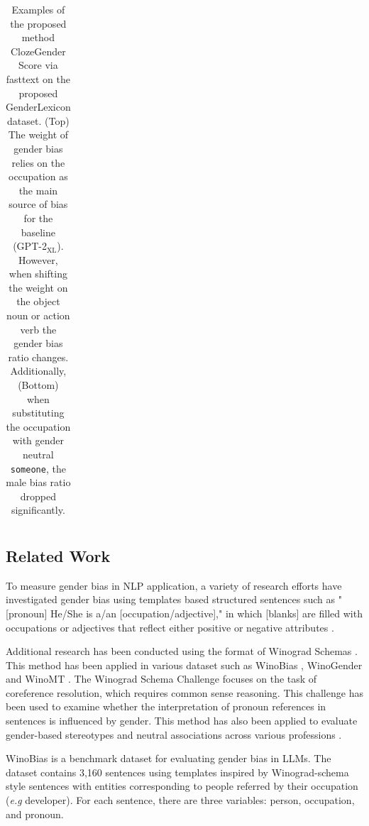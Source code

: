 \documentclass[11pt]{article}
\begin{document}
\begin{table}[t!]
{\begin{tabular}{ccccccc}
\end{tabular}
}
\vspace{-0.2cm}

\caption{Examples of the proposed method ClozeGender Score via fasttext on the proposed GenderLexicon dataset. (Top) The weight of gender bias relies on the occupation as the main source of bias for the baseline (GPT-2$_{\text{XL}}$). However, when shifting the weight on the  \textcolor{blue!60}{object noun} or  \textcolor{red!60}{action verb} the gender bias ratio changes. Additionally, (Bottom) when substituting the occupation with gender neutral \texttt{someone}, the male bias ratio dropped significantly.}
\label{tb-fig:example-1}

\end{table}

\subsection{Related Work}
To measure gender bias in NLP application, a variety of research efforts have investigated gender bias using templates based structured sentences such as "[pronoun] He/She is a/an [occupation/adjective]," in which [blanks] are filled with occupations or adjectives that reflect either positive or negative attributes \cite{bhaskaran2019good}. 


Additional research has been conducted using the format of Winograd Schemas \cite{levesque2012winograd}. This method has been applied in various dataset such as WinoBias \cite{zhao2018gender}, WinoGender \cite{rudinger-EtAl:2018:N18} and WinoMT \cite{stanovsky-etal-2019-evaluating}. The Winograd Schema Challenge focuses on the task of coreference resolution, which requires common sense reasoning. This challenge has been used to examine whether the interpretation of pronoun references in sentences is influenced by gender. This method has also been applied to evaluate gender-based stereotypes and neutral associations across various professions \cite{zhao2018gender,rudinger-EtAl:2018:N18}. 



 WinoBias is a benchmark dataset for evaluating gender bias in LLMs. The dataset contains 3,160 sentences using templates inspired by Winograd-schema style sentences  \cite{levesque2012winograd}  with entities corresponding to people referred by their occupation (\textit{e.g} developer). For each sentence, there are three variables: person, occupation, and pronoun.
\end{document}
